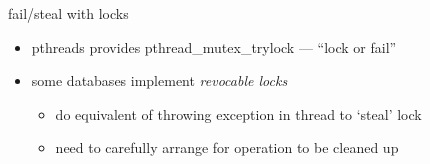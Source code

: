 \begin{frame}{fail/steal with locks}
\begin{itemize}
\item pthreads provides pthread\_mutex\_trylock --- ``lock or fail''
\item some databases implement \textit{revocable locks}
    \begin{itemize}
    \item do equivalent of throwing exception in thread to `steal' lock
    \item need to carefully arrange for operation to be cleaned up
    \end{itemize}
  \end{itemize}
\end{frame}
